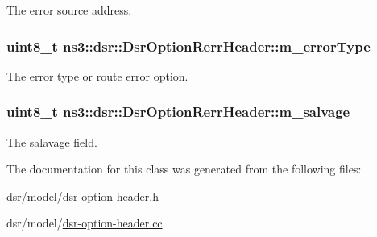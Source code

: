 The error source address. 

\subsubsection[{\texorpdfstring{m\+\_\+error\+Type}{m_errorType}}]{\setlength{\rightskip}{0pt plus 5cm}uint8\+\_\+t ns3\+::dsr\+::\+Dsr\+Option\+Rerr\+Header\+::m\+\_\+error\+Type\hspace{0.3cm}{\ttfamily [private]}}\hypertarget{classns3_1_1dsr_1_1DsrOptionRerrHeader_adc5bfd05223715cbd597895e780713ad}{}\label{classns3_1_1dsr_1_1DsrOptionRerrHeader_adc5bfd05223715cbd597895e780713ad}


The error type or route error option. 

\subsubsection[{\texorpdfstring{m\+\_\+salvage}{m_salvage}}]{\setlength{\rightskip}{0pt plus 5cm}uint8\+\_\+t ns3\+::dsr\+::\+Dsr\+Option\+Rerr\+Header\+::m\+\_\+salvage\hspace{0.3cm}{\ttfamily [private]}}\hypertarget{classns3_1_1dsr_1_1DsrOptionRerrHeader_a7c1d8a0c2f132911439b0f9be6ff4b4d}{}\label{classns3_1_1dsr_1_1DsrOptionRerrHeader_a7c1d8a0c2f132911439b0f9be6ff4b4d}


The salavage field. 



The documentation for this class was generated from the following files\+:\begin{DoxyCompactItemize}
\item 
dsr/model/\hyperlink{dsr-option-header_8h}{dsr-\/option-\/header.\+h}\item 
dsr/model/\hyperlink{dsr-option-header_8cc}{dsr-\/option-\/header.\+cc}\end{DoxyCompactItemize}
